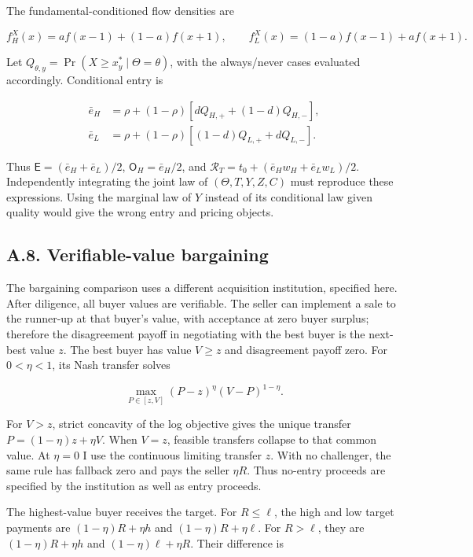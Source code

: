 \documentclass[
  11pt,
]{article}
\begin{document}
The fundamental-conditioned flow densities are

\[
f_H^X(x)=a f(x-1)+(1-a)f(x+1),\qquad
f_L^X(x)=(1-a)f(x-1)+a f(x+1).
\tag{OA.40}\label{eq:oa-oa-40}
\]

Let \(Q_{\theta,y}=\Pr(X\ge x_y^*\mid\Theta=\theta)\), with the
always/never cases evaluated accordingly. Conditional entry is

\[
\begin{aligned}
\bar e_H&=\rho+(1-\rho)[dQ_{H,+}+(1-d)Q_{H,-}],\\
\bar e_L&=\rho+(1-\rho)[(1-d)Q_{L,+}+dQ_{L,-}].
\end{aligned}
\tag{OA.41}\label{eq:oa-oa-41}
\]

Thus \(\mathsf E=(\bar e_H+\bar e_L)/2\), \(\mathsf O_H=\bar e_H/2\),
and \(\mathcal R_T=t_0+(\bar e_Hw_H+\bar e_Lw_L)/2\). Independently
integrating the joint law of \((\Theta,T,Y,Z,C)\) must reproduce these
expressions. Using the marginal law of \(Y\) instead of its conditional
law given quality would give the wrong entry and pricing objects.

\subsection{A.8. Verifiable-value bargaining}\label{oa-a-bargaining}

The bargaining comparison uses a different acquisition institution,
specified here. After diligence, all buyer values are verifiable. The
seller can implement a sale to the runner-up at that buyer's value, with
acceptance at zero buyer surplus; therefore the disagreement payoff in
negotiating with the best buyer is the next-best value \(z\). The best
buyer has value \(V\ge z\) and disagreement payoff zero. For
\(0<\eta<1\), its Nash transfer solves

\[
\max_{P\in[z,V]}(P-z)^\eta(V-P)^{1-\eta}.
\tag{OA.42}\label{eq:oa-oa-42}
\]

For \(V>z\), strict concavity of the log objective gives the unique
transfer \(P=(1-\eta)z+\eta V\). When \(V=z\), feasible transfers
collapse to that common value. At \(\eta=0\) I use the continuous
limiting transfer \(z\). With no challenger, the same rule has fallback
zero and pays the seller \(\eta R\). Thus no-entry proceeds are
specified by the institution as well as entry proceeds.

The highest-value buyer receives the target. For \(R\le\ell\), the high
and low target payments are \((1-\eta)R+\eta h\) and
\((1-\eta)R+\eta\ell\). For \(R>\ell\), they are \((1-\eta)R+\eta h\)
and \((1-\eta)\ell+\eta R\). Their difference is
\end{document}
